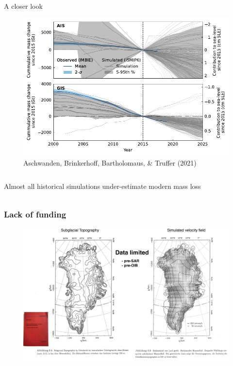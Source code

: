 \documentclass[hide notes,intlimits]{beamer}
\begin{document}
\begin{frame}{A closer look}
  \begin{figure}
    \includegraphics[width=\textwidth]{IS_Historical}
    \caption{Aschwanden, Brinkerhoff, Bartholomaus, \& Truffer (2021)}
  \end{figure}
  \begin{columns}[c]
    \begin{column}{.5\textwidth}
      \begin{minipage}[t][.5\textheight][t]{\textwidth}
        \alert{Almost all historical simulations under-estimate modern mass loss}
      \end{minipage}
    \end{column}
    \begin{column}{.25\textwidth}
    \end{column}
  \end{columns}
\end{frame}




\begin{frame}
  \frametitle{Lack of funding}
      \begin{figure}
        \includegraphics[width=\textwidth]{greve-1995}
      \end{figure}
\end{frame}
\end{document}

